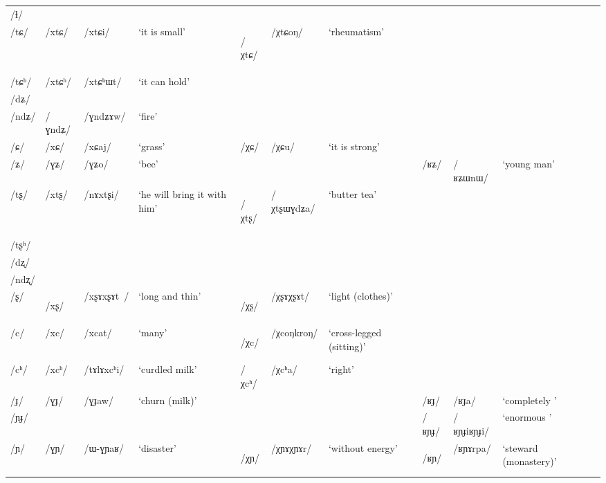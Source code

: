 \documentclass[oneside,a4paper,11pt]{article}
\newcommand{\ipa}[1]{\mbox{\phon/#1/}}
\newcommand{\deux}[1]{\ipa{#1}\addtocounter{2clusters}{1}}
\newcommand{\tib}[1]{\cellcolor{lightgray}\textbf{#1}}
\newcommand{\idph}[1]{\cellcolor{gray}\textbf{#1}}
\newcommand{\resetcounters}[2]{
\newcounter{#1}
\newcounter{#2}
 \setcounter{#1}{\value{2clusters}}
  \setcounter{#2}{\value{3clusters}}
 \setcounter{2clusters}{0}
  \setcounter{3clusters}{0}
}
\begin{document}
\begin{table}
{\begin{tabular}{lllllllllll}
\ipa{ɬ} & & & & & & & & & \\  
\ipa{tɕ} & \deux{xtɕ} & \ipa{xtɕi} & `it is small' & \deux{χtɕ}  \tib{} & \ipa{χtɕoŋ} & `rheumatism' & & & \\   
\ipa{tɕʰ} & \deux{xtɕʰ} & \ipa{xtɕʰɯt} & `it can hold' & & & & & & \\    
\ipa{dʑ} & & & & & & & & & \\  
\ipa{ndʑ} & \deux{ɣndʑ} & \ipa{ɣndʑɤw} & `fire' & & & & & & \\   
\ipa{ɕ} & \deux{xɕ} & \ipa{xɕaj} & `grass' & \deux{χɕ} & \ipa{χɕu} & `it is strong' & & &\\   
\ipa{ʑ} & \deux{ɣʑ} & \ipa{ɣʑo} & `bee' & & & & \ipa{ʁʑ} & \ipa{ʁʑɯnɯ} & `young man' \\    
\ipa{tʂ} & \deux{xtʂ} & \ipa{nɤxtʂi} & `he will bring it with him' & \deux{χtʂ}  \tib{} & \ipa{χtʂɯɣdʑa} & `butter tea' & & &\\   
\ipa{tʂʰ} & & & & & & & & & \\   
\ipa{dʐ} & & & & & & & & & \\   
\ipa{ndʐ} & & & & & & & & & \\   
\ipa{ʂ} & \deux{xʂ} \idph{} & \ipa{xʂɤxʂɤt } & `long and thin' & \deux{χʂ} \idph{} & \ipa{χʂɤχʂɤt} & `light (clothes)' & & & \\   
\ipa{c} & \deux{xc} & \ipa{xcat} & `many' & \deux{χc} \tib{} & \ipa{χcoŋkroŋ} & `cross-legged (sitting)' & & &\\   
\ipa{cʰ} & \deux{xcʰ} & \ipa{tɤlɤxcʰi} & `curdled milk' & \deux{χcʰ} & \ipa{χcʰa} & `right' & & &\\   
\ipa{ɟ} & \deux{ɣɟ} & \ipa{ɣɟaw} & `churn (milk)' & & & & \deux{ʁɟ} & \ipa{ʁɟa} & `completely ' \\   
\ipa{ɲɟ} & & & & & & & \deux{ʁɲɟ} & \ipa{ʁɲɟiʁɲɟi} & `enormous ' \\   
\ipa{ɲ} & \deux{ɣɲ} & \ipa{ɯ-ɣɲaʁ} & `disaster' & \deux{χɲ} \idph{} & \ipa{χɲɤχɲɤr} & `without energy' & \deux{ʁɲ}\tib{} & \ipa{ʁɲɤrpa} & `steward (monastery)' \\   
\bottomrule
\end{tabular}}
\end{table}
 \resetcounters{2xgC}{3xgC} %
\end{document}
